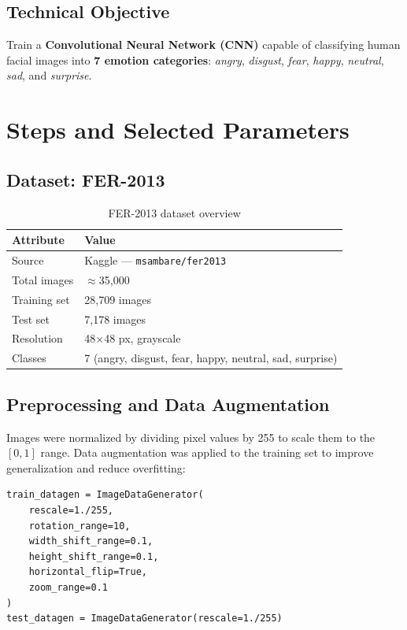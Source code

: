 \documentclass[12pt, a4paper]{article}
\begin{document}
\subsection{Technical Objective}

Train a \textbf{Convolutional Neural Network (CNN)} capable of classifying human facial images
into \textbf{7 emotion categories}: \textit{angry}, \textit{disgust}, \textit{fear},
\textit{happy}, \textit{neutral}, \textit{sad}, and \textit{surprise}.

\section{Steps and Selected Parameters}

\subsection{Dataset: FER-2013}

\begin{table}[H]
  \centering
  \caption{FER-2013 dataset overview}
  \begin{tabular}{ll}
    \toprule
    \textbf{Attribute} & \textbf{Value} \\
    \midrule
    Source             & Kaggle --- \texttt{msambare/fer2013} \\
    Total images       & $\approx$35,000 \\
    Training set       & 28,709 images \\
    Test set           & 7,178 images \\
    Resolution         & 48×48 px, grayscale \\
    Classes            & 7 (angry, disgust, fear, happy, neutral, sad, surprise) \\
    \bottomrule
  \end{tabular}
\end{table}

\subsection{Preprocessing and Data Augmentation}

Images were normalized by dividing pixel values by 255 to scale them to the $[0,1]$ range.
Data augmentation was applied to the training set to improve generalization and reduce
overfitting:

\begin{lstlisting}[style=python]
train_datagen = ImageDataGenerator(
    rescale=1./255,
    rotation_range=10,
    width_shift_range=0.1,
    height_shift_range=0.1,
    horizontal_flip=True,
    zoom_range=0.1
)
test_datagen = ImageDataGenerator(rescale=1./255)
\end{lstlisting}
\end{document}
